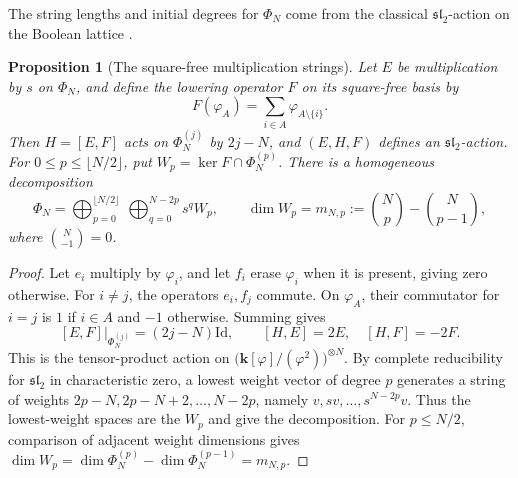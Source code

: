 \documentclass[reqno]{article}
\theoremstyle{plain} %
\newtheorem{proposition}[theorem]{Proposition}
\theoremstyle{definition}
\theoremstyle{remark}
\renewcommand{\sl}{\mathfrak{sl}_2}
\newcommand{\K} {\mathbf{k}}
\numberwithin{equation}{section}
\begin{document}
The string lengths and initial degrees for $\Phi_N$ come from the
classical $\sl$-action on the Boolean lattice
\cite{Pro,Sta}.
\begin{proposition}[The square-free multiplication strings]
\label{prop:sl2}
Let $E$ be multiplication by $s$ on $\Phi_N$, and define the lowering
operator $F$ on its square-free basis by
\[
 F(\varphi_A)=\sum_{i\in A}\varphi_{A\setminus\{i\}}.
\]
Then $H=[E,F]$ acts on $\Phi_N^{(j)}$ by $2j-N$, and
$(E,H,F)$ defines an $\sl$-action. For $0\le p\le\lfloor N/2\rfloor$,
put $W_p=\ker F\cap\Phi_N^{(p)}$. There is a homogeneous decomposition
\begin{equation}\label{eq:squarefree-strings}
 \Phi_N=
 \bigoplus_{p=0}^{\lfloor N/2\rfloor}\ \bigoplus_{q=0}^{N-2p}s^qW_p,
 \qquad
 \dim W_p=m_{N,p}:=\binom Np-\binom N{p-1},
\end{equation}
where $\binom N{-1}=0$.
\end{proposition}
\begin{proof}
Let $e_i$ multiply by $\varphi_i$, and let $f_i$ erase $\varphi_i$
when it is present, giving zero otherwise. For $i\ne j$, the operators
$e_i,f_j$ commute. On $\varphi_A$, their commutator for $i=j$ is $1$
if $i\in A$ and $-1$ otherwise. Summing gives
\begin{equation}\label{eq:H}
 [E,F]|_{\Phi_N^{(j)}}=(2j-N)\mathrm{Id},\qquad
 [H,E]=2E,\quad [H,F]=-2F.
\end{equation}
This is the tensor-product action on
$\bigl(\K[\varphi]/(\varphi^2)\bigr)^{\otimes N}$.
By complete reducibility for $\sl$ in characteristic zero, a lowest
weight vector of degree $p$ generates a string of weights
$2p-N,2p-N+2,\ldots,N-2p$, namely
$v,sv,\ldots,s^{N-2p}v$. Thus the lowest-weight spaces are the $W_p$
and give the decomposition. For $p\le N/2$, comparison of adjacent
weight dimensions gives
$\dim W_p=\dim\Phi_N^{(p)}-\dim\Phi_N^{(p-1)}=m_{N,p}$.
\end{proof}
\end{document}
